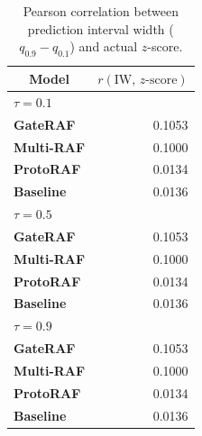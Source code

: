 \begin{table}[tb]
    \center
    \caption{Pearson correlation between prediction interval width ($q_{0.9}-q_{0.1}$) and actual $z$-score.} \label{tab:interval_calibration_corr}
    \begin{tabular}{lr} \hline
    \multicolumn{1}{c}{Model} & \multicolumn{1}{c}{$r(\mathrm{IW},\,z\text{-score})$} \\ \hline\hline
    \multicolumn{2}{l}{$\tau=0.1$} \\
    \quad \textbf{GateRAF} & 0.1053 \\
    \quad \textbf{Multi-RAF} & 0.1000 \\
    \quad \textbf{ProtoRAF} & 0.0134 \\
    \quad \textbf{Baseline} & 0.0136 \\
    \hline
    \multicolumn{2}{l}{$\tau=0.5$} \\
    \quad \textbf{GateRAF} & 0.1053 \\
    \quad \textbf{Multi-RAF} & 0.1000 \\
    \quad \textbf{ProtoRAF} & 0.0134 \\
    \quad \textbf{Baseline} & 0.0136 \\
    \hline
    \multicolumn{2}{l}{$\tau=0.9$} \\
    \quad \textbf{GateRAF} & 0.1053 \\
    \quad \textbf{Multi-RAF} & 0.1000 \\
    \quad \textbf{ProtoRAF} & 0.0134 \\
    \quad \textbf{Baseline} & 0.0136 \\
    \hline
    \end{tabular}
\end{table}
